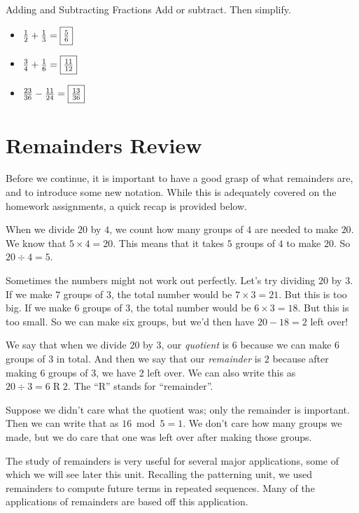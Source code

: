 \documentclass[a4paper,10pt]{report}
\begin{document}
\begin{problem}{Adding and Subtracting Fractions}
 Add or subtract. Then simplify.

 \begin{itemize}
  \item $\frac{1}{2} + \frac{1}{3} = \Ans{\frac{5}{6}}$
  \item $\frac{3}{4} + \frac{1}{6} = \Ans{\frac{11}{12}}$
  \item $\frac{23}{36} - \frac{11}{24} = \Ans{\frac{13}{36}}$
 \end{itemize}
\end{problem}

\section{Remainders Review}
Before we continue, it is important to have a good grasp of what remainders are,
and to introduce some new notation. While this is adequately covered on the
homework assignments, a quick recap is provided below.

When we divide $20$ by $4$, we count how many groups of $4$ are needed to make
$20$. We know that $5 \times 4 = 20$. This means that it takes $5$ groups of $4$
to make $20$. So $20 \div 4 = 5$.

Sometimes the numbers might not work out perfectly. Let's try dividing $20$ by
$3$. If we make $7$ groups of $3$, the total number would be $7 \times 3 = 21$.
But this is too big. If we make $6$ groups of $3$, the total number would be $6
\times 3 = 18$. But this is too small. So we can make six groups, but we'd then
have $20 - 18 = 2$ left over!

We say that when we divide $20$ by $3$, our \emph{quotient} is $6$ because we
can make $6$ groups of $3$ in total. And then we say that our \emph{remainder}
is $2$ because after making $6$ groups of $3$, we have $2$ left over. We can
also write this as $20 \div 3 = 6 \operatorname{R} 2$. The ``R'' stands for
``remainder''.

Suppose we didn't care what the quotient was; only the remainder is important.
Then we can write that as $16 \bmod 5 = 1$. We don't care how many groups we
made, but we do care that one was left over after making those groups.

The study of remainders is very useful for several major applications, some of
which we will see later this unit. Recalling the patterning unit, we used
remainders to compute future terms in repeated sequences. Many of the
applications of remainders are based off this application.
\end{document}
